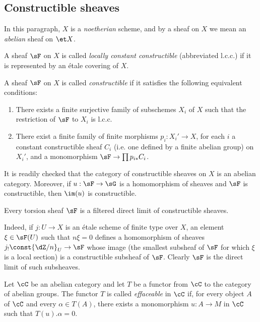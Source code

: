 \subsection{Constructible sheaves}\label{I:4-3}

In this paragraph, $X$ is a \emph{noetherian} scheme, and by a sheaf on
$X$ we mean an \emph{abelian} sheaf on $\et X$.

\begin{definition}\label{I:4-3-1}
A sheaf $\sF$ on $X$ is called \emph{locally constant constructible}
(abbreviated l.c.c.) if it is represented by an étale covering of $X$.
\end{definition}

\begin{definition}\label{I:4-3-2}
A sheaf $\sF$ on $X$ is called \emph{constructible} if it satisfies the
following equivalent conditions:
\begin{enumerate}[\indent (i)]
  \item There exists a finite surjective family of subschemes $X_i$ of
    $X$ such that the restriction of $\sF$ to $X_i$ is l.c.c.
  \item There exist a finite family of finite morphisms $p_i:X_i'\to X$,
    for each $i$ a constant constructible sheaf $C_i$ (i.e. one defined
    by a finite abelian group) on $X_i'$, and a monomorphism
    $\sF\to\prod p_{i*}C_i$.
\end{enumerate}
\end{definition}

It is readily checked that the category of constructible sheaves on $X$
is an abelian category. Moreover, if $u:\sF\to\sG$ is a homomorphism of
sheaves and $\sF$ is constructible, then $\im(u)$ is constructible.

\begin{lemma}\label{I:4-3-3}
Every torsion sheaf $\sF$ is a filtered direct limit of constructible
sheaves.
\end{lemma}

Indeed, if $j:U\to X$ is an étale scheme of finite type over $X$, an
element $\xi\in\sF(U)$ such that $n\xi=0$ defines a homomorphism of
sheaves $j_!\const{\dZ/n}_U\to\sF$ whose image (the smallest subsheaf of
$\sF$ for which $\xi$ is a local section) is a constructible subsheaf
of $\sF$. Clearly $\sF$ is the direct limit of such subsheaves.

\begin{definition}\label{I:4-3-4}
Let $\cC$ be an abelian category and let $T$ be a functor from $\cC$ to
the category of abelian groups. The functor $T$ is called
\emph{effaceable} in $\cC$ if, for every object $A$ of $\cC$ and every
$\alpha\in T(A)$, there exists a monomorphism $u:A\to M$ in $\cC$ such
that $T(u).\alpha=0$.
\end{definition}

